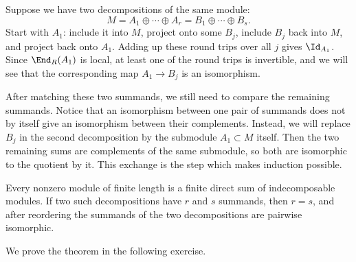 \documentclass[12pt,reqno]{amsart}
\begin{document}
Suppose we have two decompositions of the same module:
\[
M=A_1\oplus\cdots\oplus A_r=B_1\oplus\cdots\oplus B_s.
\]
Start with $A_1$: include it into $M$, project onto some $B_j$, include $B_j$ back into $M$, and project back onto $A_1$. Adding up these round trips over all $j$ gives $\Id_{A_1}$. Since $\End_R(A_1)$ is local, at least one of the round trips is invertible, and we will see that the corresponding map $A_1\to B_j$ is an isomorphism.

After matching these two summands, we still need to compare the remaining summands. Notice that an isomorphism between one pair of summands does not by itself give an isomorphism between their complements. Instead, we will replace $B_j$ in the second decomposition by the submodule $A_1\subset M$ itself. Then the two remaining sums are complements of the same submodule, so both are isomorphic to the quotient by it. This exchange is the step which makes induction possible.

\begin{theorem}
Every nonzero module of finite length is a finite direct sum of indecomposable modules. If two such decompositions have $r$ and $s$ summands, then $r=s$, and after reordering the summands of the two decompositions are pairwise isomorphic.
\end{theorem}

We prove the theorem in the following exercise.

\hrulefill
\end{document}
